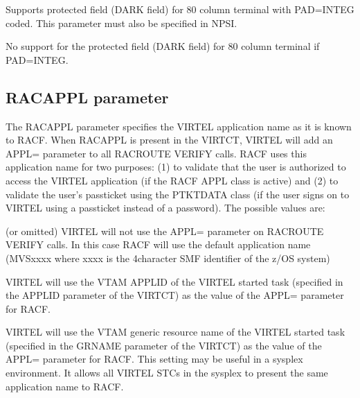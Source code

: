 \documentclass[letterpaper,10pt,english]{sphinxmanual}
\begin{document}
\sphinxAtStartPar
{} \sphinxhyphen{} Supports protected field (DARK field) for 80 column terminal with PAD=INTEG coded. This parameter must also be specified in NPSI.

\sphinxAtStartPar
{} \sphinxhyphen{} No support for the protected field (DARK field) for 80 column terminal if PAD=INTEG.

\ignorespaces 

\subsection{RACAPPL parameter}
\label{\detokenize{Installation_Guide:racappl-parameter}}\label{\detokenize{Installation_Guide:index-105}}
\begin{sphinxVerbatim}[commandchars=\\\{\}]
 
\end{sphinxVerbatim}

\sphinxAtStartPar
The RACAPPL parameter specifies the VIRTEL application name as it is known to RACF. When RACAPPL is present in the VIRTCT, VIRTEL will add an APPL= parameter to all RACROUTE VERIFY calls. RACF uses this application name for two purposes: (1) to validate that the user is authorized to access the VIRTEL application (if the RACF APPL class is active) and (2) to validate the user’s passticket using the PTKTDATA class (if the user signs on to VIRTEL using a passticket instead of a password). The possible values are:

\sphinxAtStartPar
{} (or omitted) \sphinxhyphen{} VIRTEL will not use the APPL= parameter on RACROUTE VERIFY calls. In this case RACF will use the default application name (MVSxxxx where xxxx is the 4\sphinxhyphen{}character SMF identifier of the z/OS system)

\sphinxAtStartPar
{} \sphinxhyphen{} VIRTEL will use the VTAM APPLID of the VIRTEL started task (specified in the APPLID parameter of the VIRTCT) as the value of the APPL= parameter for RACF.

\sphinxAtStartPar
{} \sphinxhyphen{} VIRTEL will use the VTAM generic resource name of the VIRTEL started task (specified in the GRNAME parameter of the VIRTCT) as the value of the APPL= parameter for RACF. This setting may be useful in a sysplex environment. It allows all VIRTEL STCs in the sysplex to present the same application name to RACF.
\end{document}
